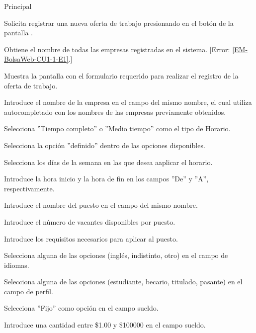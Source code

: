 	\begin{UCtrayectoria}{Principal}

		\UCpaso [\UCactor] Solicita registrar una nueva oferta de trabajo presionando en el botón  de la pantalla .

		\UCpaso Obtiene el nombre de todas las empresas registradas en el sistema. [Error: \ref{EM-BolsaWeb-CU1-1-E1}.]

		\UCpaso Muestra la pantalla  con el formulario requerido para realizar el registro de la oferta de trabajo.

		\UCpaso [\UCactor] Introduce el nombre de la empresa en el campo del mismo nombre, el cual utiliza autocompletado con los nombres de las empresas previamente obtenidos. \label{l_EM_BolsaWeb_CU1_1_InicioFormulario}

		\UCpaso [\UCactor] Selecciona ''Tiempo completo'' o ''Medio tiempo'' como el tipo de Horario.   

		\UCpaso [\UCactor] Selecciona la opción ''definido'' dentro de las opciones disponibles.  

		\UCpaso [\UCactor] Selecciona los días de la semana en las que desea aaplicar el horario.

		\UCpaso [\UCactor] Introduce la hora inicio y la hora de fin en los campos ''De'' y ''A'', respectivamente. 

		\UCpaso [\UCactor] Introduce el nombre del puesto en el campo del mismo nombre. \label{l_EM_BolsaWeb_CU1_1_NombrePuesto}

		\UCpaso [\UCactor] Introduce el número de vacantes disponibles por puesto.

		\UCpaso [\UCactor] Introduce los requisitos necesarios para aplicar al puesto.

		\UCpaso [\UCactor] Selecciona alguna de las opciones (inglés, indistinto, otro) en el campo de idiomas.

		\UCpaso [\UCactor] Selecciona alguna de las opciones (estudiante, becario, titulado, pasante) en el campo de perfil.

		\UCpaso [\UCactor] Selecciona ''Fijo'' como opción en el campo sueldo.  
 
		\UCpaso [\UCactor] Introduce una cantidad entre \$1.00 y \$100000 en el campo sueldo.


\end{UCtrayectoria}
